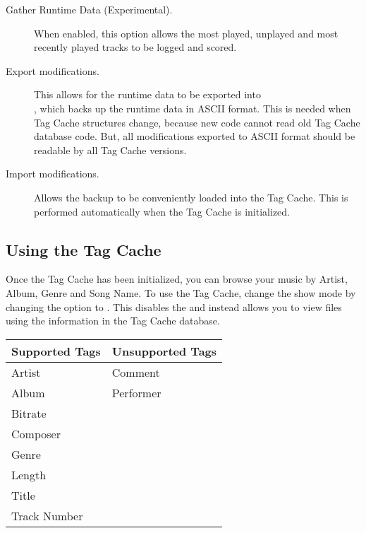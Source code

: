 \begin{description}
\item[Gather Runtime Data (Experimental).]
  When enabled, this option allows the most played, unplayed and most recently
  played tracks to be logged and scored.
  
\item[Export modifications.]
  This allows for the runtime data to be exported into \\
  , which backs up the runtime data in
  ASCII format. This is needed when Tag Cache structures change, because new
  code cannot read old Tag Cache database code. But, all modifications
  exported to ASCII format should be readable by all Tag Cache versions.
  
\item[Import modifications.]
  Allows the  backup to be 
  conveniently loaded into the Tag Cache. This is performed automatically when
  the Tag Cache is initialized.
  
\end{description}

\subsection{Using the Tag Cache}
Once the Tag Cache has been initialized, you can browse your music by Artist, 
Album, Genre and Song Name. To use the Tag Cache, change the 
 show mode by changing the  option to 
. This disables the  and instead
allows you to view files using the information in the Tag Cache database.\\

%
\begin{table}
\begin{center}
  \begin{tabularx}{.75\textwidth}{XX}%
  \toprule%
  \textbf{Supported Tags}   & \textbf{Unsupported Tags} \\
  \midrule
  Artist           & Comment \\
  Album            & Performer\\
  Bitrate          & \\
  Composer         & \\
  Genre            & \\
  Length           & \\
  Title            & \\
  Track Number     & \\
  \bottomrule
  \end{tabularx}
\end{center}
\end{table}
